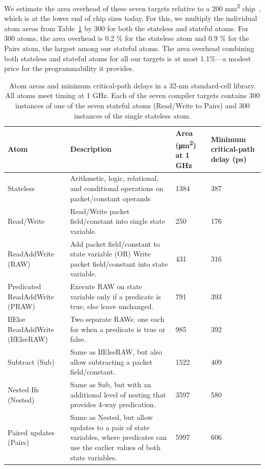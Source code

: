 We estimate the area overhead of these seven targets relative to a 200
\si{\milli\metre\squared} chip~\cite{gibb_parsing}, which is at the lower end
of chip sizes today. For this, we multiply the individual atom areas from
Table~\ref{tab:templates} by 300 for both the stateless and stateful atoms. For
300 atoms, the area overhead is 0.2 \% for the stateless atom and 0.9 \% for
the Pairs atom, the largest among our stateful atoms.  The area overhead
combining both stateless and stateful atoms for all our targets is at most
1.1\%---a modest price for the programmability it provides.
\begin{table}[!t]
  \centering
  \begin{small}
  \begin{tabular}{|p{}|p{}|p{}|p{}|}
    \hline
    Atom & Description & Area (\si{\micro\metre\squared}) at 1 GHz & Minimum critical-path delay (ps) \\
    \hline
    Stateless & Arithmetic, logic, relational, and conditional operations on packet/constant operands & 1384 & 387 \\
    \hline
    Read/Write & Read/Write packet field/constant into single state variable. & 250 & 176 \\
    \hline
    ReadAddWrite (RAW) & Add packet field/constant to state variable (OR) Write packet field/constant into state variable. & 431 & 316 \\
    \hline
    Predicated ReadAddWrite (PRAW) & Execute RAW on state variable only if a predicate is true, else leave unchanged. & 791 & 393 \\
    \hline
    IfElse ReadAddWrite (IfElseRAW) & Two separate RAWs: one each for when a predicate is true or false. & 985 & 392 \\
    \hline
    Subtract (Sub) & Same as IfElseRAW, but also allow subtracting a packet field/constant. & 1522 & 409 \\
    \hline
    Nested Ifs (Nested) & Same as Sub, but with an additional level of nesting that provides 4-way predication. & 3597 & 580 \\
    \hline
    Paired updates (Pairs) & Same as Nested, but allow updates to a pair of state variables, where predicates can use the earlier values of both state variables. & 5997 & 606 \\
    \hline
  \end{tabular}
  \end{small}
  \caption{Atom areas and minimum critical-path delays in a 32-nm standard-cell
library.  All atoms meet timing at 1 GHz. Each of the seven compiler targets
contains 300 instances of one of the seven stateful atoms (Read/Write to Pairs)
and 300 instances of the single stateless atom.}
  \label{tab:templates}
\end{table}

